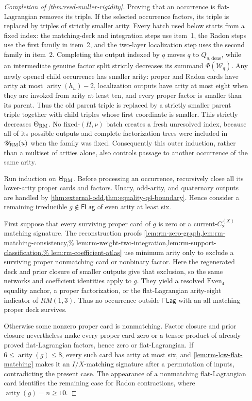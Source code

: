 \documentclass[11pt,letterpaper,onecolumn]{article}
\theoremstyle{plain}
\theoremstyle{definition}
\theoremstyle{remark}
\newcommand{\CycX}[1]{{C_{#1}^{(X)}}}
\newcommand{\FLag}{\mathsf{FLag}}
\newcommand{\arity}{\operatorname{arity}}
\begin{document}
\begin{proof}[Completion of \cref{thm:reed-muller-rigidity}]
Proving that an occurrence is flat-Lagrangian removes its triple.  If the selected occurrence
factors, its triple is replaced by triples of strictly smaller arity.  Every
batch used below starts from a fixed index: the matching-deck and integration
steps use item~1, the Radon steps use the first family in item~2, and the
two-layer localization step uses the second family in item~2.  Completing the output indexed by \(q\) moves
\(q\) to \(Q_{u,\mathrm{done}}\), while an intermediate genuine factor split
strictly decreases its summand \(\Phi(\mathcal W_q)\).  Any newly opened
child occurrence has smaller arity: proper and Radon cards have arity at
most \(\arity(h_u)-2\), localization outputs have arity at most eight when
they are invoked from arity at least ten, and every proper factor is smaller
than its parent.  Thus the old parent triple is replaced by a strictly
smaller parent triple together with child triples whose first coordinate is
smaller.  This strictly decreases \(\Theta_{\rm RM}\).  No fixed-\((H,\nu)\)
batch creates a fresh unresolved index, because all of its possible outputs
and complete factorization trees were included in \(\mathscr U_{\rm RM}(u)\) when the family was fixed.  Consequently this outer induction, rather than a multiset of
arities alone, also controls passage to another occurrence of the same
arity.

Run induction on \(\Theta_{\rm RM}\).  Before processing an occurrence,
recursively close all its lower-arity proper cards and factors.  Unary,
odd-arity, and quaternary outputs are handled by
\cref{thm:external-odd,thm:equality-q4-boundary}.  Hence consider a
remaining irreducible \(g\notin\FLag\) of even arity at least six.

First suppose that every surviving proper card of \(g\) is zero or a
current-\(\CycX{2}\) matching signature. The reconstruction proofs
\cref{lem:rm-zero-graph,lem:rm-matching-consistency,%
lem:rm-weight-two-integration,lem:rm-support-classification,%
lem:rm-coefficient-atlas}
use minimum arity only to exclude a surviving proper nonmatching card or
nonbinary factor. Here the regenerated deck and prior closure of smaller
outputs give that exclusion, so the same networks and coefficient identities
apply to \(g\). They yield a resolved \(\mathrm{Even}_4\) equality anchor,
a proper factorization, or the flat-Lagrangian arity-eight indicator of
\(RM(1,3)\). Thus no occurrence outside \(\FLag\) with an all-matching
proper deck survives.

Otherwise some nonzero proper card is nonmatching.  Factor closure and
prior closure nevertheless make every proper card zero or a tensor product
of already proved flat-Lagrangian factors, hence zero or
flat-Lagrangian.  If \(6\le\arity(g)\le8\), every such card has arity at most
six, and \cref{lem:rm-low-flat-matching} makes it an \(I/X\)-matching
signature after a permutation of inputs, contradicting the present case.  The
appearance of a nonmatching flat-Lagrangian card identifies the remaining case for Radon contractions, where
\(\arity(g)=n\ge10\).


\end{proof}
\end{document}
